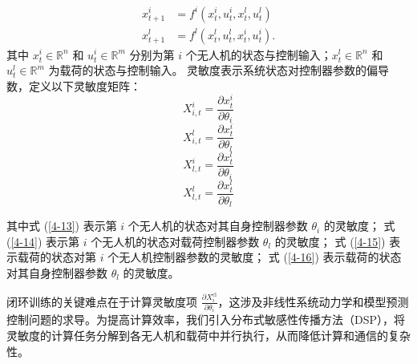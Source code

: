 \documentclass[lang=chs, degree=master, blindreview=false, winfonts=true]{yanputhesis}
\begin{document}
\begin{equation}
	\begin{aligned}
		x^i_{t+1} &= f^i(x^i_t, u^i_t, x^l_t, u^l_t)\\
x^l_{t+1} &= f^l(x^l_t, u^l_t, x^i_t, u^i_t).
	\end{aligned}
\end{equation}
其中 $x^i_t \in \mathbb{R}^n$ 和 $u^i_t \in \mathbb{R}^m$ 分别为第 $i$ 个无人机的状态与控制输入；$x^l_t \in \mathbb{R}^n$ 和 $u^l_t \in \mathbb{R}^m$ 为载荷的状态与控制输入。
灵敏度表示系统状态对控制器参数的偏导数，定义以下灵敏度矩阵：
\begin{equation}
	X^i_{i,t} = \frac{\partial x^i_t}{\partial \theta_i}
	\label{4-13}
\end{equation}
\begin{equation}
	\label{4-14}
	X^l_{i,t} = \frac{\partial x^i_t}{\partial \theta_l}
\end{equation}
\begin{equation}
	\label{4-15}
	X^i_{l,t} = \frac{\partial x^l_t}{\partial \theta_i}
\end{equation}
\begin{equation}
	\label{4-16}
	X^l_{l,t} = \frac{\partial x^l_t}{\partial \theta_l}
\end{equation}

其中式 (\ref{4-13}) 表示第 $i$ 个无人机的状态对其自身控制器参数 $\theta_i$ 的灵敏度；
式 (\ref{4-14}) 表示第 $i$ 个无人机的状态对载荷控制器参数 $\theta_l$ 的灵敏度；
式 (\ref{4-15}) 表示载荷的状态对第 $i$ 个无人机控制器参数的灵敏度；
式 (\ref{4-16}) 表示载荷的状态对其自身控制器参数 $\theta_l$ 的灵敏度。

闭环训练的关键难点在于计算灵敏度项 $\frac{\partial X_i^\text{cl}}{\partial \theta_i}$，这涉及非线性系统动力学和模型预测控制问题的求导。为提高计算效率，我们引入分布式敏感性传播方法（DSP），将灵敏度的计算任务分解到各无人机和载荷中并行执行，从而降低计算和通信的复杂性。

\end{document}
